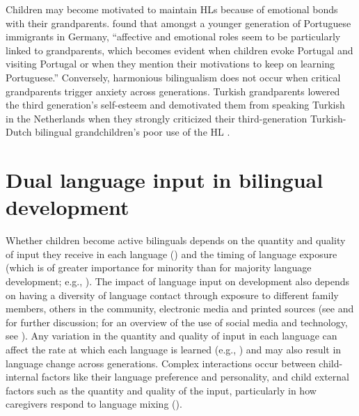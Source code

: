 \documentclass[output=paper,colorlinks,citecolor=brown]{langscibook}
\begin{document}
Children may become motivated to maintain HLs because of emotional bonds with their grandparents. \citet[40]{Melo-Pfeifer2015} found that amongst a younger generation of Portuguese immigrants in Germany, “affective and emotional roles seem to be particularly linked to grandparents, which becomes evident when children evoke Portugal and visiting Portugal or when they mention their motivations to keep on learning Portuguese.” Conversely, harmonious bilingualism does not occur when critical grandparents trigger anxiety across generations. Turkish grandparents lowered the third generation’s self-esteem and demotivated them from speaking Turkish in the Netherlands when they strongly criticized their third-generation Turkish-Dutch bilingual grandchildren’s poor use of the HL \citep{Sevinç2020}. 

\section{Dual language input in bilingual development}

Whether children become active bilinguals depends on the quantity and quality of input they receive in each language (\citealt{SchalleyEisenchlas2022}) and the timing of language exposure (which is of greater importance for minority than for majority language development; e.g., \citealt{HoffCore2013, Montrul2022}). The impact of language input on development also depends on having a diversity of language contact through exposure to different family members, others in the community, electronic media and printed sources (see \citealt{QuayMontanari2016} and \citealt{QuayChevalier2019} for further discussion; for an overview of the use of social media and technology, see \citealt{Little2020b}). Any variation in the quantity and quality of input in each language can affect the rate at which each language is learned (e.g., \citealt{Cantone2022}) and may also result in language change across generations. Complex interactions occur between child-internal factors like their language preference and personality, and child external factors such as the quantity and quality of the input, particularly in how caregivers respond to language mixing (\citealt{Chevalier2013, Quay2012}). 
\end{document}
